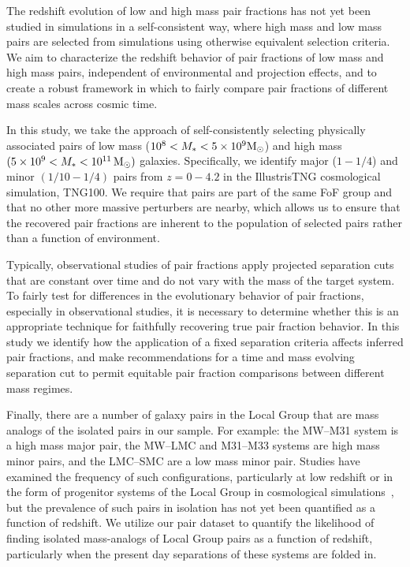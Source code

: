 \documentclass[twocolumn]{aastex631}
\begin{document}
    The redshift evolution of low and high mass pair fractions has not yet been studied in simulations in a self-consistent way, where high mass and low mass pairs are selected from simulations using otherwise equivalent selection criteria. 
    We aim to characterize the redshift behavior of pair fractions of low mass and high mass pairs, independent of environmental and projection effects, and to create a robust framework in which to fairly compare pair fractions of different mass scales across cosmic time. 
    
    In this study, we take the approach of self-consistently selecting physically associated pairs of low mass ($10^8<M_*<5\times10^9\mathrm{M}_\odot$) and high mass $(5\times10^9<M_*<10^{11}\,\mathrm{M}_\odot)$ galaxies. 
    Specifically, we identify major ($1-1/4$) and minor $(1/10-1/4)$ pairs from $z=0-4.2$ in the IllustrisTNG cosmological simulation, TNG100. 
    We require that pairs are part of the same FoF group and that no other more massive perturbers are nearby, which allows us to ensure that the recovered pair fractions are inherent to the population of selected pairs rather than a function of environment. 
  
    Typically, observational studies of pair fractions apply projected separation cuts that are constant over time and do not vary with the mass of the target system. 
    To fairly test for differences in the evolutionary behavior of pair fractions, especially in observational studies, it is necessary to determine whether this is an appropriate technique for faithfully recovering true pair fraction behavior.
    In this study we identify how the application of a fixed separation criteria affects inferred pair fractions, and make recommendations for a time and mass evolving separation cut to permit equitable pair fraction comparisons between different mass regimes.

    Finally, there are a number of galaxy pairs in the Local Group that are mass analogs of the isolated pairs in our sample.
    For example: the MW--M31 system is a high mass major pair, the MW--LMC and M31--M33 systems are high mass minor pairs, and the LMC--SMC are a low mass minor pair.
    Studies have examined the frequency of such configurations, particularly at low redshift or in the form of progenitor systems of the Local Group in cosmological simulations~\citep{Bk2011,Fattahi2013,Patel2017a-Orbits,Geha2017,Mao2021}, but the prevalence of such pairs in isolation has not yet been quantified as a function of redshift. 
    We utilize our pair dataset to quantify the likelihood of finding isolated mass-analogs of Local Group pairs as a function of redshift, particularly when the present day separations of these systems are folded in. 
    
\end{document}
